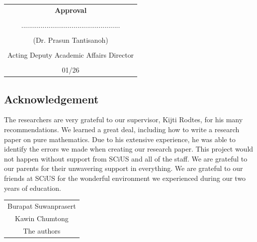 \documentclass[12pt]{article}
\begin{document}
\begin{flushright}
\begin{tabular}{c}
 \textbf{Approval} \\
 \\
................................................... \\
 \\
(Dr. Prasun Tantisanoh) \\
 \\
Acting Deputy Academic Affairs Director\\
 \\
01/26
\end{tabular}
\end{flushright}
\clearpage
{}
\newpage
\begin{center}
\section*{Acknowledgement}
\end{center}
The researchers are very grateful to our supervisor, Kijti Rodtes, for his many recommendations. We learned a great deal, including how to write a research paper on pure mathematics. Due to his extensive experience, he was able to identify the errors we made when creating our research paper. This project would not happen without support from SCiUS and all of the staff. We are grateful to our parents for their unwavering support in everything. We are grateful to our friends at SCiUS for the wonderful environment we experienced during our two years of education.
\vspace{1cm}
\begin{flushright}
\begin{tabular}{ c }
 Burapat Suwanprasert \\ 
 Kawin Chumtong \\
 The authors
\end{tabular}
\end{flushright}
\newpage 
\end{document}
